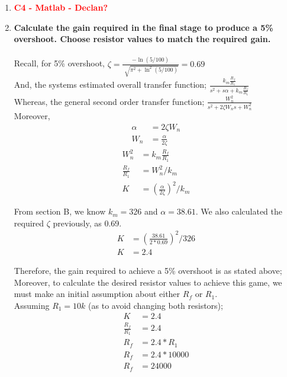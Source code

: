 \documentclass[11pt,a4paper]{article}
\begin{document}
\begin{enumerate}
    
    
    
    
    
    
    
    
    
	\item \textbf{\textcolor{red}{C4 - Matlab - Declan?}}
    
    
    
    
    
    
    
    
    \pagebreak
	\item \textbf{Calculate the gain required in the final stage to produce a 5\% overshoot. Choose resistor values to match the required gain.} \\\\
    Recall, for 5\% overshoot, $\zeta = \frac{-\ln(5/100)}{\sqrt[]{\pi^2+\ln^2(5/100)}} = 0.69$\\
    And, the systems estimated overall transfer function; $\frac{k_m\frac{R_f}{R_1}}{s^2 + s\alpha + k_m\frac{R_f}{R_1}}$\\
    Whereas, the general second order transfer function; $\frac{W_n^2}{s^2 + 2\zeta W_n s + W_n^2}$\\
    Moreover, 
    \begin{align*}
	\alpha &= 2\zeta W_n\\
    W_n &= \frac{\alpha}{2\zeta}
	\end{align*}
    \begin{align*}
	W_n^2 &= k_m\frac{R_f}{R_1}\\
    \frac{R_f}{R_1} &= W_n^2/k_m\\
    K &= (\frac{\alpha}{2\zeta})^2/k_m
	\end{align*}
    
    From section B, we know $k_m = 326$ and $\alpha = 38.61$. We also calculated the required $\zeta$ previously, as 0.69. 
    \begin{align*}
    K &= (\frac{38.61}{2*0.69})^2/326\\
    K &= 2.4
	\end{align*}
    
    Therefore, the gain required to achieve a 5\% overshoot is as stated above; Moreover, to calculate the desired resistor values to achieve this game, we must make an initial assumption about either $R_f$ or $R_1$. \\
    Assuming $R_1 = 10k$ (as to avoid changing both resistors);
    \begin{align*}
    K &= 2.4 \\
    \frac{R_f}{R_1} &= 2.4 \\
    R_f &= 2.4*R_1 \\
    R_f &= 2.4*10 000 \\
    R_f &= 24 000 
	\end{align*}
    

\end{enumerate}
\end{document}
